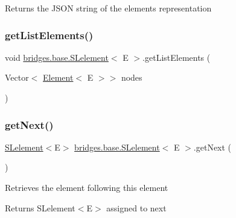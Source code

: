 \begin{DoxyReturn}{Returns}
the J\+S\+ON string of the element\textquotesingle{}s representation 
\end{DoxyReturn}
\mbox{\label{classbridges_1_1base_1_1_s_lelement_abadffea339171349a8e86ded9cd3fe21}} 
\subsubsection{\texorpdfstring{get\+List\+Elements()}{getListElements()}}
{\footnotesize\ttfamily void \mbox{\hyperlink{classbridges_1_1base_1_1_s_lelement}{bridges.\+base.\+S\+Lelement}}$<$ E $>$.get\+List\+Elements (\begin{DoxyParamCaption}\item[{Vector$<$ \mbox{\hyperlink{classbridges_1_1base_1_1_element}{Element}}$<$ E $>$$>$}]{nodes }\end{DoxyParamCaption})\hspace{0.3cm}{\ttfamily [protected]}}

\mbox{\label{classbridges_1_1base_1_1_s_lelement_a060c4671e05e3f20b16630343393b80d}} 
\subsubsection{\texorpdfstring{get\+Next()}{getNext()}}
{\footnotesize\ttfamily \mbox{\hyperlink{classbridges_1_1base_1_1_s_lelement}{S\+Lelement}}$<$E$>$ \mbox{\hyperlink{classbridges_1_1base_1_1_s_lelement}{bridges.\+base.\+S\+Lelement}}$<$ E $>$.get\+Next (\begin{DoxyParamCaption}{ }\end{DoxyParamCaption})}

Retrieves the element following this element

\begin{DoxyReturn}{Returns}
S\+Lelement$<$\+E$>$ assigned to next 
\end{DoxyReturn}
\mbox{\label{classbridges_1_1base_1_1_s_lelement_a2ecf938707a8009f28dcb98112ede9d9}} 
